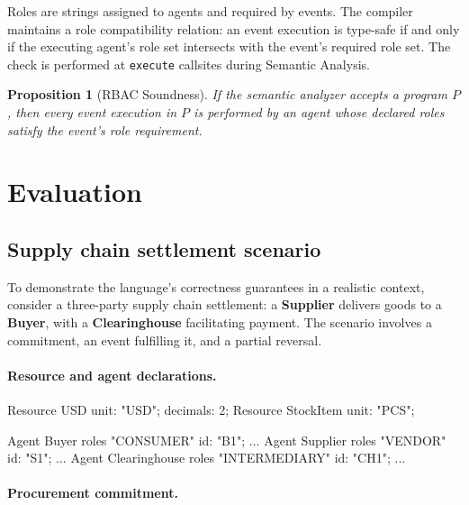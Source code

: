 \documentclass[11pt,a4paper]{article}
\newtheorem{proposition}[theorem]{Proposition}
\theoremstyle{remark}
\begin{document}
Roles are strings assigned to agents and required by events. The
compiler maintains a role compatibility relation: an event execution is
type-safe if and only if the executing agent's role set intersects with
the event's required role set. The check is performed at
\texttt{execute} callsites during Semantic Analysis.

\begin{proposition}[RBAC Soundness]\label{prop:rbac}
If the semantic analyzer accepts a program $P$, then every event
execution in $P$ is performed by an agent whose declared roles satisfy
the event's role requirement.
\end{proposition}

\section{Evaluation}\label{sec:eval}

\subsection{Supply chain settlement scenario}

To demonstrate the language's correctness guarantees in a realistic
context, consider a three-party supply chain settlement: a
\textbf{Supplier} delivers goods to a \textbf{Buyer}, with a
\textbf{Clearinghouse} facilitating payment. The scenario involves a
commitment, an event fulfilling it, and a partial reversal.

\paragraph{Resource and agent declarations.}

\begin{equiscode}
Resource USD       { unit: "USD"; decimals: 2; }
Resource StockItem { unit: "PCS"; }

Agent Buyer         roles { "CONSUMER" }     { id: "B1";  ... }
Agent Supplier      roles { "VENDOR" }       { id: "S1";  ... }
Agent Clearinghouse roles { "INTERMEDIARY" } { id: "CH1"; ... }
\end{equiscode}

\paragraph{Procurement commitment.}
\end{document}
